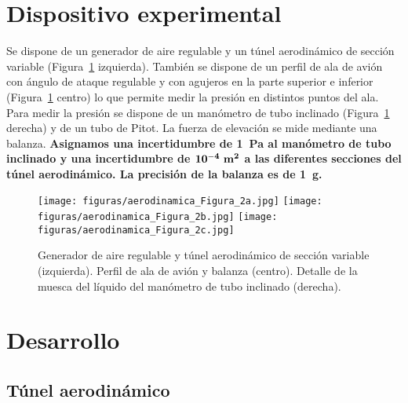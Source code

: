 \documentclass[11pt]{articulo}
\begin{document}
\section{Dispositivo experimental}

Se dispone de un generador de aire regulable y un t\'unel aerodin\'amico de secci\'on variable (Figura~\ref{dispositivo} izquierda). Tambi\'en se dispone de un perfil de ala de avi\'on con \'angulo de ataque regulable y con agujeros en la parte superior e inferior (Figura~\ref{dispositivo} centro) lo que permite medir la presi\'on en distintos puntos del ala. Para medir la presi\'on se dispone de un man\'ometro de tubo inclinado (Figura~\ref{dispositivo} derecha) y de un tubo de Pitot. La fuerza de elevaci\'on se mide mediante una balanza. {\bf Asignamos una incertidumbre de 1~Pa al man\'ometro de tubo inclinado y una incertidumbre de $\mathbf{10^{-4}~{\rm\bf m}^2}$ a las diferentes secciones del t\'unel aerodin\'amico. La precisi\'on de la balanza es de 1~g.}
%
\begin{figure}[htb]
\begin{center}
\hspace*{0.0cm}
\texttt{[image: figuras/aerodinamica\_Figura\_2a.jpg]}
\texttt{[image: figuras/aerodinamica\_Figura\_2b.jpg]}
\texttt{[image: figuras/aerodinamica\_Figura\_2c.jpg]}
\end{center}
\vspace*{-0.6cm}
\caption[]{\label{dispositivo}{Generador de aire regulable y t\'unel aerodin\'amico de secci\'on variable (izquierda). Perfil de ala de avi\'on y balanza (centro). Detalle de la muesca del l\'iquido del man\'ometro de tubo inclinado (derecha).}}
\end{figure}


\section{Desarrollo}

\subsection{T\'unel aerodin\'amico}
\end{document}
